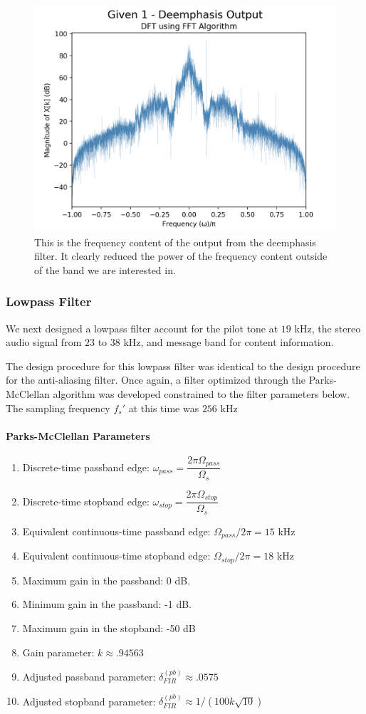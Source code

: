 \documentclass{article}
\begin{document}
\begin{figure}[h] \label{fig:deemphasis_4}
    \caption{}
    \centering
    \includegraphics[width=.5\textwidth]{given_1_deemphasis.png}
    \caption{This is the frequency content of the output from the deemphasis filter. It clearly reduced the power of the frequency content outside of the band we are interested in.}
\end{figure}

\subsubsection{Lowpass Filter}

We next designed a lowpass filter account for the pilot tone at $19$ kHz, the stereo audio signal from $23$ to $38$ kHz, and message band for content information. 

The design procedure for this lowpass filter was identical to the design procedure for the anti-aliasing filter. Once again, a filter optimized through the Parks-McClellan algorithm was developed constrained to the filter parameters below. The sampling frequency $f_s'$ at this time was $256$ kHz

\paragraph{Parks-McClellan Parameters}
\begin{enumerate}
    \item Discrete-time passband edge: $\omega_{pass} =  \dfrac{2\pi\Omega_{pass}}{\Omega_s}$
    \item Discrete-time stopband edge: $\omega_{stop} =   \dfrac{2\pi\Omega_{stop}}{\Omega_s}$
    \item Equivalent continuous-time passband edge: $\Omega_{pass}/2\pi = 15$ kHz
    \item Equivalent continuous-time stopband edge: $\Omega_{stop}/2\pi = 18$ kHz
    \item Maximum gain in the passband: 0 dB.
    \item Minimum gain in the passband: -1 dB.
    \item Maximum gain in the stopband: -50 dB
    \item Gain parameter: $k \approx .94563 $
    \item Adjusted passband parameter: $\delta^{(pb)}_{FIR} \approx .0575$
    \item Adjusted stopband parameter: $\delta^{(pb)}_{FIR} \approx 1/(100k\sqrt{10})$
\end{enumerate}
\end{document}
